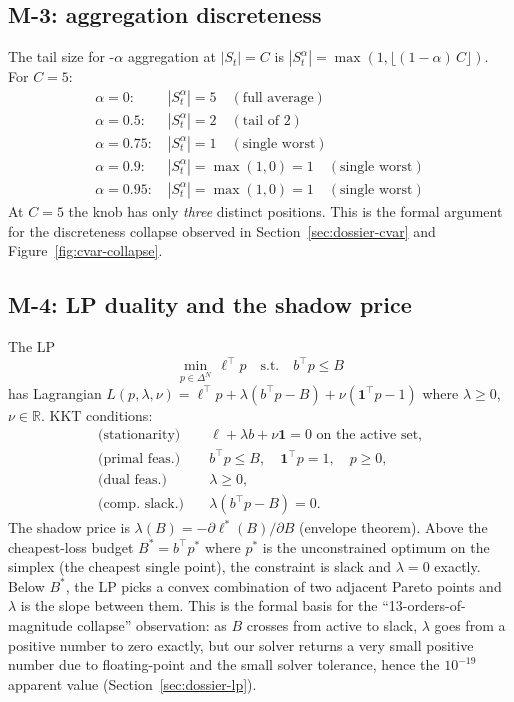 \subsection{M-3: \cvar{} aggregation discreteness}

The tail size for \cvar{}-$\alpha$ aggregation at $|S_t|\!=\!C$ is
$|S_t^\alpha| = \max(1, \lfloor (1-\alpha)\,C\rfloor)$. For $C = 5$:
\begin{align*}
\alpha = 0    : \, &|S_t^\alpha| = 5  \quad (\text{full average})\\
\alpha = 0.5  : \, &|S_t^\alpha| = 2  \quad (\text{tail of 2})\\
\alpha = 0.75 : \, &|S_t^\alpha| = 1  \quad (\text{single worst})\\
\alpha = 0.9  : \, &|S_t^\alpha| = \max(1, 0) = 1 \quad (\text{single worst})\\
\alpha = 0.95 : \, &|S_t^\alpha| = \max(1, 0) = 1 \quad (\text{single worst})
\end{align*}
At $C\!=\!5$ the knob has only \emph{three} distinct positions.
This is the formal argument for the discreteness collapse observed
in Section~\ref{sec:dossier-cvar} and Figure~\ref{fig:cvar-collapse}.

\subsection{M-4: LP duality and the shadow price}

The LP
\[
\min_{p \in \Delta^N} \,\ell^\top p \quad \text{s.t.} \quad
b^\top p \leq B
\]
has Lagrangian $L(p, \lambda, \nu) = \ell^\top p +
\lambda(b^\top p - B) + \nu(\mathbf{1}^\top p - 1)$ where
$\lambda \geq 0$, $\nu \in \mathbb{R}$. KKT conditions:
\begin{align*}
\text{(stationarity)} \quad & \ell + \lambda b + \nu \mathbf{1} = 0
                            \text{ on the active set,}\\
\text{(primal feas.)}\quad & b^\top p \leq B,\quad \mathbf{1}^\top p = 1,\quad p \geq 0,\\
\text{(dual feas.)}\quad & \lambda \geq 0,\\
\text{(comp. slack.)}\quad & \lambda(b^\top p - B) = 0.
\end{align*}
The shadow price is $\lambda(B) = -\partial \ell^*(B)/\partial B$
(envelope theorem). Above the cheapest-loss budget $B^* = b^\top
p^*$ where $p^*$ is the unconstrained optimum on the simplex (the
cheapest single point), the constraint is slack and $\lambda = 0$
exactly. Below $B^*$, the LP picks a convex combination of two
adjacent Pareto points and $\lambda$ is the slope between them.
This is the formal basis for the ``13-orders-of-magnitude collapse''
observation: as $B$ crosses from active to slack, $\lambda$ goes
from a positive number to zero exactly, but our solver returns a
very small positive number due to floating-point and the small
solver tolerance, hence the $10^{-19}$ apparent value
(Section~\ref{sec:dossier-lp}).

